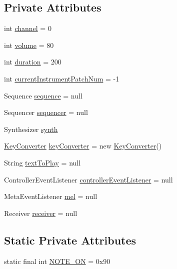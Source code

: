 \subsection*{Private Attributes}
\begin{DoxyCompactItemize}
\item 
int \hyperlink{classcom_1_1lclion_1_1midiplayer_1_1_m_i_d_i_player_adf7dff2c57c0da9a4a2b70e3e815be31}{channel} = 0
\item 
int \hyperlink{classcom_1_1lclion_1_1midiplayer_1_1_m_i_d_i_player_aed48ca0bcd2162fd4fd495873e2631f5}{volume} = 80
\item 
int \hyperlink{classcom_1_1lclion_1_1midiplayer_1_1_m_i_d_i_player_ac6e4b2a3cf932b33832d4e4e4e7cd0de}{duration} = 200
\item 
int \hyperlink{classcom_1_1lclion_1_1midiplayer_1_1_m_i_d_i_player_a421d9b518a4d3273cec866d51b135803}{current\+Instrument\+Patch\+Num} = -\/1
\item 
Sequence \hyperlink{classcom_1_1lclion_1_1midiplayer_1_1_m_i_d_i_player_aae9bd69432c806ce0c10016839a874a2}{sequence} = null
\item 
Sequencer \hyperlink{classcom_1_1lclion_1_1midiplayer_1_1_m_i_d_i_player_a857733a65a16f85598c03acd97305607}{sequencer} = null
\item 
Synthesizer \hyperlink{classcom_1_1lclion_1_1midiplayer_1_1_m_i_d_i_player_a4356e5541666df1f482a781ea4f6ff42}{synth}
\item 
\hyperlink{classcom_1_1lclion_1_1midiparser_1_1_key_converter}{Key\+Converter} \hyperlink{classcom_1_1lclion_1_1midiplayer_1_1_m_i_d_i_player_acc7c29517d4ac6fb6eb51b8d9b714728}{key\+Converter} = new \hyperlink{classcom_1_1lclion_1_1midiparser_1_1_key_converter}{Key\+Converter}()
\item 
String \hyperlink{classcom_1_1lclion_1_1midiplayer_1_1_m_i_d_i_player_af7f77ddd1de996adaa69c1f5d8492dfa}{text\+To\+Play} = null
\item 
Controller\+Event\+Listener \hyperlink{classcom_1_1lclion_1_1midiplayer_1_1_m_i_d_i_player_a3e129365b1af8a27e0e46ff8334d1415}{controller\+Event\+Listener} = null
\item 
Meta\+Event\+Listener \hyperlink{classcom_1_1lclion_1_1midiplayer_1_1_m_i_d_i_player_a4a46968d288601bb1f3180ee85507266}{mel} = null
\item 
Receiver \hyperlink{classcom_1_1lclion_1_1midiplayer_1_1_m_i_d_i_player_a679c25b0c10670fdd4d2fb4f8cd774ec}{receiver} = null
\end{DoxyCompactItemize}
\subsection*{Static Private Attributes}
\begin{DoxyCompactItemize}
\item 
static final int \hyperlink{classcom_1_1lclion_1_1midiplayer_1_1_m_i_d_i_player_ac035f42f6f27179d122b97d54fd030e1}{N\+O\+T\+E\+\_\+\+O\+N} = 0x90
\end{DoxyCompactItemize}


